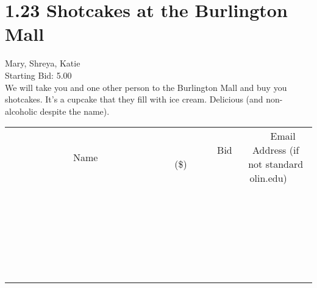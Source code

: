 \documentclass[11pt]{article}
\begin{document}
					\section*{1.23 Shotcakes at the Burlington Mall}
					Mary, Shreya, Katie \\
					Starting Bid: 5.00 \\
					We will take you and one other person to the Burlington Mall and buy you shotcakes.  It's a cupcake that they fill with ice cream.  Delicious (and non-alcoholic despite the name). \\
					[6ex]
					\begin{tabular}{c c c}
						~~~~~~~~~~~~~Name~~~~~~~~~~~~~ & ~~~~~~~~~Bid (\$)~~~~~~~~~ & ~~~Email Address (if not standard olin.edu)~~~ \\
				
 & & \\
\hline
 & & \\
\hline
 & & \\
\hline
 & & \\
\hline
 & & \\
\hline
 & & \\
\hline
 & & \\
\hline
 & & \\
\hline
 & & \\
\hline
 & & \\
\hline
 & & \\
\hline
 & & \\
\hline
 & & \\
\hline
 & & \\
\hline
 & & \\
\hline
 & & \\
\hline
 & & \\
\hline
 & & \\
\hline
 & & \\
\hline
 & & \\
\hline
 & & \\
\hline
 & & \\
\hline
 & & \\
\hline
 & & \\
\hline
 & & \\
\hline
 & & \\
\hline
					\end{tabular}
					\clearpage
				
\end{document}
